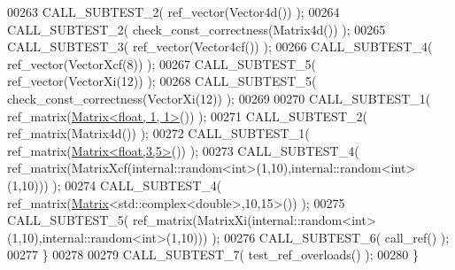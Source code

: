 \begin{DoxyCode}
00263     CALL\_SUBTEST\_2( ref\_vector(Vector4d()) );
00264     CALL\_SUBTEST\_2( check\_const\_correctness(Matrix4d()) );
00265     CALL\_SUBTEST\_3( ref\_vector(Vector4cf()) );
00266     CALL\_SUBTEST\_4( ref\_vector(VectorXcf(8)) );
00267     CALL\_SUBTEST\_5( ref\_vector(VectorXi(12)) );
00268     CALL\_SUBTEST\_5( check\_const\_correctness(VectorXi(12)) );
00269 
00270     CALL\_SUBTEST\_1( ref\_matrix(\hyperlink{group___core___module_class_eigen_1_1_matrix}{Matrix<float, 1, 1>}()) );
00271     CALL\_SUBTEST\_2( ref\_matrix(Matrix4d()) );
00272     CALL\_SUBTEST\_1( ref\_matrix(\hyperlink{group___core___module_class_eigen_1_1_matrix}{Matrix<float,3,5>}()) );
00273     CALL\_SUBTEST\_4( ref\_matrix(MatrixXcf(internal::random<int>(1,10),internal::random<int>(1,10))) );
00274     CALL\_SUBTEST\_4( ref\_matrix(\hyperlink{group___core___module_class_eigen_1_1_matrix}{Matrix}<std::complex<double>,10,15>()) );
00275     CALL\_SUBTEST\_5( ref\_matrix(MatrixXi(internal::random<int>(1,10),internal::random<int>(1,10))) );
00276     CALL\_SUBTEST\_6( call\_ref() );
00277   \}
00278   
00279   CALL\_SUBTEST\_7( test\_ref\_overloads() );
00280 \}
\end{DoxyCode}
